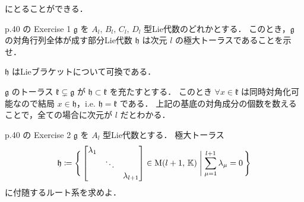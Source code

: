 \documentclass{ltjsarticle}
\makeatletter
\theoremstyle{mystyle} %
\renewcommand{\proofname}{証明}
\renewenvironment{proof}[1][\proofname]{\par
    \pushQED{\qed}%
    \normalfont \topsep6\p@\@plus6\p@\relax
    \trivlist
    \item[\hskip\labelsep
        \itshape
    \textbf{\underline{#1}}]\ignorespaces
}{%
    \popQED\endtrivlist\@endpefalse
}
\numberwithin{equation}{section}
\makeatother
\begin{document}
にとることができる．

\begin{myproblem}[label=ex:2-8-1]{p.40 の Exercise 1}
    $\mathfrak{g}$ を $A_l,\, B_l,\, C_l,\, D_l$ 型Lie代数のどれかとする．
    このとき，$\mathfrak{g}$ の対角行列全体が成す部分Lie代数 $\mathfrak{h}$ は次元 $l$ の極大トーラスであることを示せ．
\end{myproblem}

\begin{proof}
    $\mathfrak{h}$ はLieブラケットについて可換である．

    $\mathfrak{g}$ のトーラス $\mathfrak{k} \subsetneq \mathfrak{g}$ が $\mathfrak{h} \subset \mathfrak{k}$ を充たすとする．
    このとき $\forall x \in \mathfrak{k}$ は同時対角化可能なので結局 $x \in \mathfrak{h}$，i.e. $\mathfrak{h} = \mathfrak{k}$ である．
    上記の基底の対角成分の個数を数えることで，全ての場合に次元が $l$ だとわかる．
\end{proof}

\begin{myproblem}[label=ex:2-8-2A]{p.40 の Exercise 2}
    $\mathfrak{g}$ を $A_l$ 型Lie代数とする．
    極大トーラス
    \begin{align}
        \mathfrak{h} \coloneqq \Biggl\{\, \mqty[\dmat{\lambda_1,\ddots,\lambda_{l+1}}] \in \Mat{l+1}{\mathbb{K}}\Biggm| \sum_{\mu=1}^{l+1} \lambda_\mu = 0 \,\Biggr\} 
    \end{align}
    に付随するルート系を求めよ．
\end{myproblem}
\end{document}
